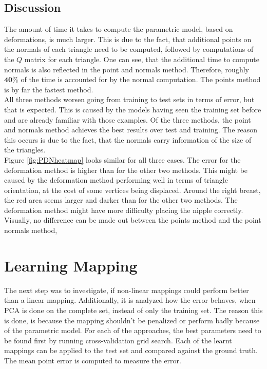 \subsection{Discussion}
The amount of time it takes to compute the parametric model, based on deformations, is much larger. This is due to the fact, that additional points on the normals of each triangle need to be computed, followed by computations of the $Q$ matrix for each triangle. One can see, that the additional time to compute normals is also reflected in the point and normals method. Therefore, roughly $\mathbf{40\%}$ of the time is accounted for by the normal computation. The points method is by far the fastest method.\\
All three methods worsen going from training to test sets in terms of error, but that is expected. This is caused by the models having seen the training set before and are already familiar with those examples. Of the three methods, the point and normals method achieves the best results over test and training. The reason this occurs is due to the fact, that the normals carry information of the size of the triangles.\\
Figure \ref{fig:PDNheatmap} looks similar for all three cases. The error for the deformation method is higher than for the other two methods. This might be caused by the deformation method performing well in terms of triangle orientation, at the cost of some vertices being displaced. Around the right breast, the red area seems larger and darker than for the other two methods. The deformation method might have more difficulty placing the nipple correctly. Visually, no difference can be made out between the points method and the point normals method,

\section{Learning Mapping}
The next step was to investigate, if non-linear mappings could perform better than a linear mapping. Additionally, it is analyzed how the error behaves, when PCA is done on the complete set, instead of only the training set. The reason this is done, is because the mapping shouldn't be penalized or perform badly because of the parametric model. For each of the approaches, the best parameters need to be found first by running cross-validation grid search. Each of the learnt mappings can be applied to the test set and compared against the ground truth. The mean point error is computed to measure the error.

